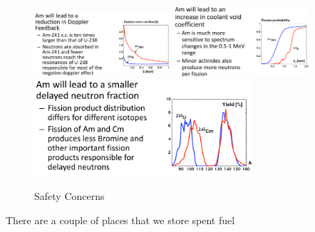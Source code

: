 \documentclass{school-22.211-notes}
\begin{document}
\begin{enumerate}
  \begin{figure}[h]
    \centering
    \includegraphics[width=0.45\textwidth]{images/dfs/safety-Doppler.png}
    \includegraphics[width=0.45\textwidth]{images/dfs/safety-void.png}
    \includegraphics[width=3.2in]{images/dfs/safety-delayed-neutrons.png}
    \caption{Safety Concerns} \label{safety-concern}
  \end{figure}
\end{enumerate}



There are a couple of places that we store spent fuel
\end{document}
